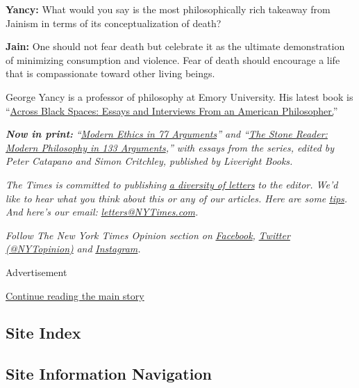 \textbf{Yancy:} What would you say is the most philosophically rich
takeaway from Jainism in terms of its conceptualization of death?

\textbf{Jain:} One should not fear death but celebrate it as the
ultimate demonstration of minimizing consumption and violence. Fear of
death should encourage a life that is compassionate toward other living
beings.

George Yancy is a professor of philosophy at Emory University. His
latest book is
``\href{https://rowman.com/ISBN/9781538131619/Across-Black-Spaces-Essays-and-Interviews-from-an-American-Philosopher}{Across
Black Spaces: Essays and Interviews From an American Philosopher.}''

\emph{\textbf{Now in print:}}
\emph{``}\href{http://bitly.com/1MW2kN3}{\emph{Modern Ethics in 77
Arguments}}\emph{'' and ``}\href{http://bitly.com/1MW2kN3}{\emph{The
Stone Reader: Modern Philosophy in 133 Arguments}}\emph{,'' with essays
from the series, edited by Peter Catapano and Simon Critchley, published
by Liveright Books.}

\emph{The Times is committed to publishing}
\href{https://www.nytimes3xbfgragh.onion/2019/01/31/opinion/letters/letters-to-editor-new-york-times-women.html}{\emph{a
diversity of letters}} \emph{to the editor. We'd like to hear what you
think about this or any of our articles. Here are some}
\href{https://help.nytimes3xbfgragh.onion/hc/en-us/articles/115014925288-How-to-submit-a-letter-to-the-editor}{\emph{tips}}\emph{.
And here's our email:}
\href{mailto:letters@NYTimes.com}{\emph{letters@NYTimes.com}}\emph{.}

\emph{Follow The New York Times Opinion section on}
\href{https://www.facebookcorewwwi.onion/nytopinion}{\emph{Facebook}}\emph{,}
\href{http://twitter.com/NYTOpinion}{\emph{Twitter (@NYTopinion)}}
\emph{and}
\href{https://www.instagram.com/nytopinion/}{\emph{Instagram}}\emph{.}

Advertisement

\protect\hyperlink{after-bottom}{Continue reading the main story}

\hypertarget{site-index}{%
\subsection{Site Index}\label{site-index}}

\hypertarget{site-information-navigation}{%
\subsection{Site Information
Navigation}\label{site-information-navigation}}

